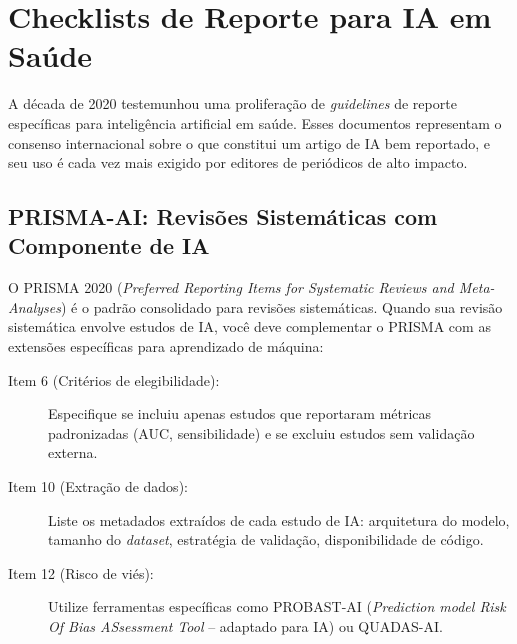 
\section{Checklists de Reporte para IA em Saúde}
\label{sec:checklists-ia}

\nivelquatro

A década de 2020 testemunhou uma proliferação de \textit{guidelines} de reporte
específicas para inteligência artificial em saúde. Esses documentos representam
o consenso internacional sobre o que constitui um artigo de IA bem reportado,
e seu uso é cada vez mais exigido por editores de periódicos de alto impacto.


\subsection{PRISMA-AI: Revisões Sistemáticas com Componente de IA}

O PRISMA 2020 (\textit{Preferred Reporting Items for Systematic Reviews and
Meta-Analyses}) é o padrão consolidado para revisões sistemáticas. Quando sua
revisão sistemática envolve estudos de IA, você deve complementar o PRISMA com
as extensões específicas para aprendizado de máquina:

\begin{description}
  \item[Item 6 (Critérios de elegibilidade):] Especifique se incluiu apenas
    estudos que reportaram métricas padronizadas (AUC, sensibilidade) e se
    excluiu estudos sem validação externa.
  \item[Item 10 (Extração de dados):] Liste os metadados extraídos de cada
    estudo de IA: arquitetura do modelo, tamanho do \textit{dataset}, estratégia
    de validação, disponibilidade de código.
  \item[Item 12 (Risco de viés):] Utilize ferramentas específicas como
    PROBAST-AI (\textit{Prediction model Risk Of Bias ASsessment Tool} --
    adaptado para IA) ou QUADAS-AI.
\end{description}

